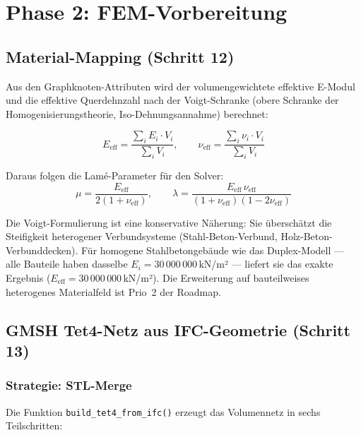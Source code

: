 \documentclass[a4paper,11pt]{article}
\begin{document}
\section{Phase 2: FEM-Vorbereitung}

\subsection{Material-Mapping (Schritt 12)}

Aus den Graphknoten-Attributen wird der volumengewichtete effektive E-Modul und die effektive Querdehnzahl nach der Voigt-Schranke (obere Schranke der Homogenisierungstheorie, Iso-Dehnungsannahme) berechnet:

\begin{equation}
  E_\text{eff} = \frac{\displaystyle\sum_{i} E_i \cdot V_i}{\displaystyle\sum_{i} V_i},
  \qquad
  \nu_\text{eff} = \frac{\displaystyle\sum_{i} \nu_i \cdot V_i}{\displaystyle\sum_{i} V_i}
\end{equation}

Daraus folgen die Lamé-Parameter für den Solver:
\begin{equation}
  \mu = \frac{E_\text{eff}}{2(1+\nu_\text{eff})},
  \qquad
  \lambda = \frac{E_\text{eff}\,\nu_\text{eff}}{(1+\nu_\text{eff})(1-2\nu_\text{eff})}
\end{equation}

Die Voigt-Formulierung ist eine konservative Näherung: Sie überschätzt die Steifigkeit heterogener Verbundsysteme (Stahl-Beton-Verbund, Holz-Beton-Verbunddecken). Für homogene Stahlbetongebäude wie das Duplex-Modell — alle Bauteile haben dasselbe $E_i = 30\,000\,000$\,kN/m² — liefert sie das exakte Ergebnis ($E_\text{eff} = 30\,000\,000$\,kN/m²). Die Erweiterung auf bauteilweises heterogenes Materialfeld ist Prio~2 der Roadmap.

\subsection{GMSH Tet4-Netz aus IFC-Geometrie (Schritt 13)}

\subsubsection{Strategie: STL-Merge}

Die Funktion \texttt{build\_tet4\_from\_ifc()} erzeugt das Volumennetz in sechs Teilschritten:
\end{document}
